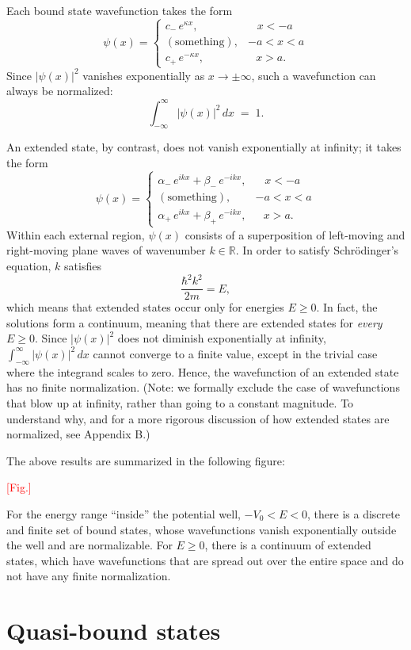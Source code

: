 \documentclass[pra,11pt]{revtex4}
\begin{document}
Each bound state wavefunction takes the form
$$\psi(x) = \begin{cases} c_-\, e^{\kappa x}, & \;\;\;x < -a\\ (\mathrm{something}) , & -a < x < a\\ c_+\, e^{-\kappa x} , & \;\;\,x > a.\end{cases}$$
Since $|\psi(x)|^2$ vanishes exponentially as $x \rightarrow \pm
\infty$, such a wavefunction can always be normalized:
$$\int_{-\infty}^\infty |\psi(x)|^2\, dx\; =\; 1.$$

An extended state, by contrast, does not vanish exponentially at
infinity; it takes the form
$$\psi(x) = \begin{cases} \alpha_-\, e^{ik x} + \beta_-\, e^{-ik x}, & \;\;\;x < -a\\ (\mathrm{something}) , & -a < x < a\\ \alpha_+\, e^{ik x} + \beta_+\, e^{-ik x} , & \;\;\,x > a.\end{cases}$$
Within each external region, $\psi(x)$ consists of a superposition of
left-moving and right-moving plane waves of wavenumber $k \in
\mathbb{R}$.  In order to satisfy Schr\"odinger's equation, $k$
satisfies
$$\frac{\hbar^2k^2}{2m} = E,$$
which means that extended states occur only for energies $E \ge 0$.
In fact, the solutions form a continuum, meaning that there are
extended states for \textit{every} $E \ge 0$.  Since $|\psi(x)|^2$
does not diminish exponentially at infinity, $\int_{-\infty}^\infty
|\psi(x)|^2\, dx$ cannot converge to a finite value, except in the
trivial case where the integrand scales to zero.  Hence, the
wavefunction of an extended state has no finite normalization.  (Note:
we formally exclude the case of wavefunctions that blow up at
infinity, rather than going to a constant magnitude.  To understand
why, and for a more rigorous discussion of how extended states are
normalized, see Appendix B.)

The above results are summarized in the following figure:

\textcolor{red}{[Fig.]}

For the energy range ``inside'' the potential well, $-V_0 < E < 0$,
there is a discrete and finite set of bound states, whose
wavefunctions vanish exponentially outside the well and are
normalizable.  For $E \ge 0$, there is a continuum of extended states,
which have wavefunctions that are spread out over the entire space and
do not have any finite normalization.

\section{Quasi-bound states}
\end{document}
